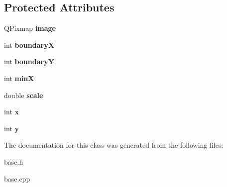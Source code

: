 \subsection*{Protected Attributes}
\begin{DoxyCompactItemize}
\item 
\mbox{\label{classgame_1_1Base_a1e5729a88c5d8693843cd5d8d7f2b041}} 
Q\+Pixmap {\bfseries image}
\item 
\mbox{\label{classgame_1_1Base_a3a1a3e4d76a32e7c2ecb63e07652319e}} 
int {\bfseries boundaryX}
\item 
\mbox{\label{classgame_1_1Base_a6673c7e5dae9e4c5a29e4c2a2bb64b5d}} 
int {\bfseries boundaryY}
\item 
\mbox{\label{classgame_1_1Base_a24955d46b4f95d9617859eb7fbf78fe7}} 
int {\bfseries minX}
\item 
\mbox{\label{classgame_1_1Base_a9778a44ad5cdcf606b69d71998284109}} 
double {\bfseries scale}
\item 
\mbox{\label{classgame_1_1Base_aa5c743423c08a054edddae452d84099a}} 
int {\bfseries x}
\item 
\mbox{\label{classgame_1_1Base_a844bdeed367cd32056e0a289c350a337}} 
int {\bfseries y}
\end{DoxyCompactItemize}


The documentation for this class was generated from the following files\+:\begin{DoxyCompactItemize}
\item 
base.\+h\item 
base.\+cpp\end{DoxyCompactItemize}
